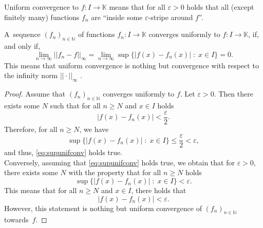 \begin{Remark}{}
Uniform convergence to $f:I\to\mathbb{K}$ means that for all $\varepsilon>0$ holds that all (except finitely many) functions $f_n$ are ``inside some $\varepsilon$-stripe around $f$''.
\end{Remark}

\begin{Theorem}{}
A~sequence $(f_n)_{n\in\mathbb{N}}$ of functions $f_n:I\to\mathbb{K}$ converges uniformly to $f:I\to\mathbb{K}$, if, and only if,
\begin{equation}\label{eq:supunifconv}
\lim_{n\to\infty}||f_n-f||_\infty=\lim_{n\to\infty}\sup\{|f(x)-f_n(x)|\;:\;x\in I\}=0.
\end{equation}
This means that uniform convergence is nothing but convergence with respect to the infinity norm $||\cdot||_\infty$ .
\end{Theorem}



\begin{proof}
Assume that $(f_n)_{n\in\mathbb{N}}$ converges uniformly to $f$. Let $\varepsilon>0$. Then there exists some $N$ such that for all $n\geq N$ and $x\in I$ holds
\[|f(x)-f_n(x)|<\frac\varepsilon2.\]
Therefore, for all $n\geq N$, we have
\[\sup\{|f(x)-f_n(x)|\;:\;x\in I\}\leq\frac\varepsilon2<\varepsilon,\]
and thus, \eqref{eq:supunifconv} holds true.\\
Conversely, assuming that \eqref{eq:supunifconv} holds true, we obtain that for $\varepsilon>0$, there exists some $N$ with the property that for all $n\geq N$ holds
\[\sup\{|f(x)-f_n(x)|\;:\;x\in I\}<\varepsilon.\]
This means that for all $n\geq N$ and $x\in I$, there holds that
\[|f(x)-f_n(x)|<\varepsilon.\]
However, this statement is nothing but uniform convergence of $(f_n)_{n\in\mathbb{N}}$ towards~$f$.
\end{proof}


